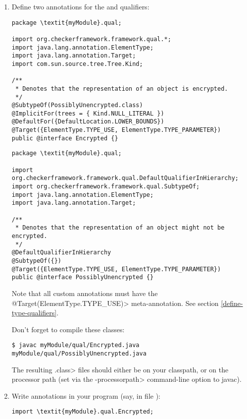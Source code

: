 \begin{enumerate}
\item
Define two annotations for the  and  qualifiers:

\begin{Verbatim}
package \textit{myModule}.qual;

import org.checkerframework.framework.qual.*;
import java.lang.annotation.ElementType;
import java.lang.annotation.Target;
import com.sun.source.tree.Tree.Kind;

/**
 * Denotes that the representation of an object is encrypted.
 */
@SubtypeOf(PossiblyUnencrypted.class)
@ImplicitFor(trees = { Kind.NULL_LITERAL })
@DefaultFor({DefaultLocation.LOWER_BOUNDS})
@Target({ElementType.TYPE_USE, ElementType.TYPE_PARAMETER})
public @interface Encrypted {}
\end{Verbatim}

\begin{Verbatim}
package \textit{myModule}.qual;

import org.checkerframework.framework.qual.DefaultQualifierInHierarchy;
import org.checkerframework.framework.qual.SubtypeOf;
import java.lang.annotation.ElementType;
import java.lang.annotation.Target;

/**
 * Denotes that the representation of an object might not be encrypted.
 */
@DefaultQualifierInHierarchy
@SubtypeOf({})
@Target({ElementType.TYPE_USE, ElementType.TYPE_PARAMETER})
public @interface PossiblyUnencrypted {}
\end{Verbatim}

Note that all custom annotations must have the
\<@Target({ElementType.TYPE\_USE})> meta-annotation. See section
\ref{define-type-qualifiers}.

Don't forget to compile these classes:

\begin{Verbatim}
$ javac myModule/qual/Encrypted.java myModule/qual/PossiblyUnencrypted.java
\end{Verbatim}

The resulting \<.class> files should either be on your classpath, or on the
processor path (set via the \<-processorpath> command-line option to javac).

\item
  Write  annotations in your program (say, in file
  ):

\begin{Verbatim}
import \textit{myModule}.qual.Encrypted;


\end{Verbatim}
\end{enumerate}

